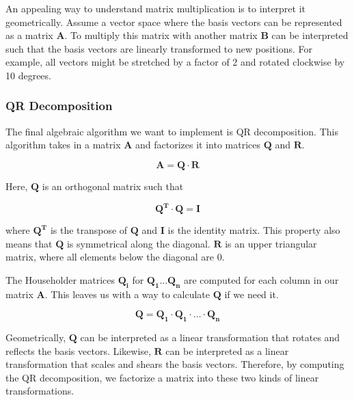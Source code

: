 An appealing way to understand matrix multiplication is to interpret it geometrically. Assume a vector space where the basis vectors can be represented as a matrix $\mathbf{A}$. To multiply this matrix with another matrix $\mathbf{B}$ can be interpreted such that the basis vectors are linearly transformed to new positions. For example, all vectors might be stretched by a factor of 2 and rotated clockwise by 10 degrees. 

\subsubsection{QR Decomposition}
The final algebraic algorithm we want to implement is QR decomposition. This algorithm takes in a matrix \(\mathbf{A}\) and factorizes it into matrices \(\mathbf{Q}\) and \(\mathbf{R}\).

\[\mathbf{A} = \mathbf{Q} \cdot \mathbf{R}\]

\noindent Here, \(\mathbf{Q}\) is an orthogonal matrix such that 

\[\mathbf{Q^T \cdot Q = I}\]

where \(\mathbf{Q^T}\) is the transpose of \(\mathbf{Q}\) and \(\mathbf{I}\) is the identity matrix. This property also means that \(\mathbf{Q}\) is symmetrical along the diagonal. \(\mathbf{R}\) is an upper triangular matrix, where all elements below the diagonal are 0. 


The Householder matrices \(\mathbf{Q_i}\) for \(\mathbf{Q_1 \ldots Q_{n}}\) are computed for each column in our matrix \(\mathbf{A}\). This leaves us with a way to calculate \(\mathbf{Q}\) if we need it.\cite[Sect. 2.13, 11.2]{numericalrecipes}

\[\mathbf{Q = Q_1 \cdot Q_1 \cdot \ldots \cdot Q_{n}}\]


Geometrically, \(\mathbf{Q}\) can be interpreted as a linear transformation that rotates and reflects the basis vectors. Likewise, \(\mathbf{R}\) can be interpreted as a linear transformation that scales and shears the basis vectors. Therefore, by computing the QR decomposition, we factorize a matrix into these two kinds of linear transformations. 


